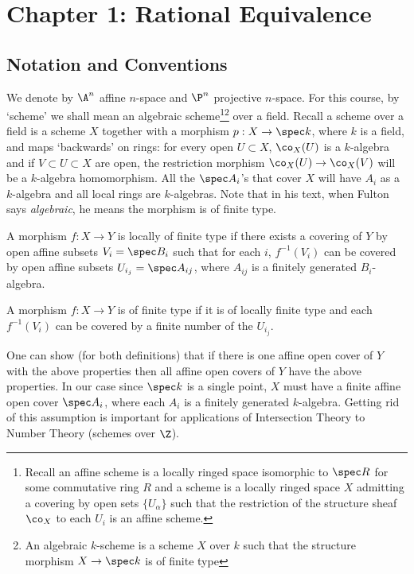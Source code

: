 
\newpage
\section{Chapter 1: Rational Equivalence}
\subsection{Notation and Conventions}


We denote by $\A^n$ affine $n$-space and $\P^n$ projective $n$-space. For this course, by `scheme' we shall mean an algebraic scheme\footnote{Recall an affine scheme is a locally ringed space isomorphic to $\spec R$ for some commutative ring $R$ and a scheme is a locally ringed space $X$ admitting a covering by open sets $\{U_\alpha\}$ such that the restriction of the structure sheaf $\co_X$ to each $U_i$ is an affine scheme.}\footnote{An algebraic $k$-scheme is a scheme $X$ over $k$ such that the structure morphism $X \to \spec k$ is of finite type} over a field. Recall a scheme over a field is a scheme $X$ together with a morphism $p: X \to \spec k$, where $k$ is a field, and maps `backwards' on rings: for every open $U \subset X$, $\co_X(U)$ is a $k$-algebra and if $V \subset U \subset X$ are open, the restriction morphism $\co_X(U) \to \co_X(V)$ will be a $k$-algebra homomorphism. All the $\spec A_i$'s that cover $X$ will have $A_i$ as a $k$-algebra and all local rings are $k$-algebras. Note that in his text, when Fulton says \emph{algebraic}, he means the morphism is of finite type.


\begin{dfn}
A morphism $f: X \to Y$ is locally of finite type if there exists a covering of $Y$ by open affine subsets $V_i= \spec B_i$ such that for each $i$, $f^{-1}(V_i)$ can be covered by open affine subsets $U_{i_j} = \spec A_{ij}$, where $A_{ij}$ is a finitely generated $B_i$-algebra. 
\end{dfn}


\begin{dfn}
A morphism $f: X \to Y$ is of finite type if it is of locally finite type and each $f^{-1}(V_i)$ can be covered by a finite number of the $U_{i_j}$. 
\end{dfn}


One can show (for both definitions) that if there is one affine open cover of $Y$ with the above properties then all affine open covers of $Y$ have the above properties. In our case since $\spec k$ is a single point, $X$ must have a finite affine open cover $\spec A_i$, where each $A_i$ is a finitely generated $k$-algebra. Getting rid of this assumption is important for applications of Intersection Theory to Number Theory (schemes over $\Z$). 


